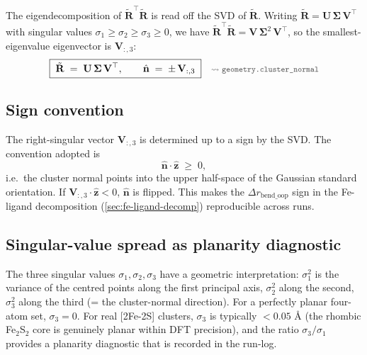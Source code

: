 \documentclass[10pt,a4paper,twoside]{article}
\newcommand{\Rmat}{\mathbf{R}}
\newcommand{\zhat}{\hat{\mathbf{z}}}
\newcommand{\nhat}{\hat{\mathbf{n}}}
\newcommand{\Umat}{\mathbf{U}}
\newcommand{\Vmat}{\mathbf{V}}
\newcommand{\Smat}{\boldsymbol{\Sigma}}
\newcommand{\codref}[1]{%
  \quad\text{\textcolor{gray!70!black}{\footnotesize $\rightsquigarrow$~\texttt{#1}}}}
\begin{document}
The eigendecomposition of $\tilde{\Rmat}^\top \tilde{\Rmat}$ is
read off the SVD of $\tilde{\Rmat}$. Writing
$\tilde{\Rmat} = \Umat\,\Smat\,\Vmat^\top$ with singular values
$\sigma_1 \geq \sigma_2 \geq \sigma_3 \geq 0$, we have
$\tilde{\Rmat}^\top \tilde{\Rmat}
   = \Vmat\,\Smat^2\,\Vmat^\top$, so the smallest-eigenvalue
eigenvector is $\Vmat_{:,3}$:
\begin{equation}
  \boxed{\;\tilde{\Rmat}
    \;=\;
   \Umat\,\Smat\,\Vmat^\top,
   \qquad
   \nhat
    \;=\;
   \pm\,\Vmat_{:,3}\;}
  \codref{geometry.cluster\_normal}
  \label{eq:cluster-normal-svd}
\end{equation}

\subsection{Sign convention}
\label{sec:cluster-normal-sign}

The right-singular vector $\Vmat_{:,3}$ is determined up to a sign by
the SVD. The convention adopted is
\begin{equation}
  \nhat \cdot \zhat \;\geq\; 0,
  \label{eq:nhat-sign-conv}
\end{equation}
i.e.\ the cluster normal points into the upper half-space of the
Gaussian standard orientation. If $\Vmat_{:,3} \cdot \zhat < 0$,
$\nhat$ is flipped. This makes the $\Delta r_\text{bend\_oop}$
sign in the Fe-ligand decomposition (\cref{sec:fe-ligand-decomp})
reproducible across runs.

\subsection{Singular-value spread as planarity diagnostic}

The three singular values $\sigma_1, \sigma_2, \sigma_3$ have a
geometric interpretation: $\sigma_1^2$ is the variance of the
centred points along the first principal axis, $\sigma_2^2$ along
the second, $\sigma_3^2$ along the third (= the cluster-normal
direction). For a perfectly planar four-atom set,
$\sigma_3 = 0$. For real [2Fe-2S] clusters, $\sigma_3$ is typically
$< 0.05$ \AA{} (the rhombic Fe$_2$S$_2$ core is genuinely planar
within DFT precision), and the ratio $\sigma_3/\sigma_1$ provides
a planarity diagnostic that is recorded in the run-log.
\end{document}
